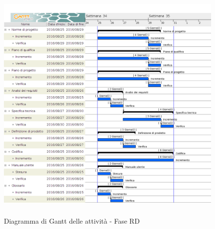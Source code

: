 		\begin{figure}[!h]
			\centering
			\includegraphics[height=12cm, width=15cm]{img/gantt/RD} 
			\caption{Diagramma di Gantt delle attività - Fase RD}
		\end{figure}
		
